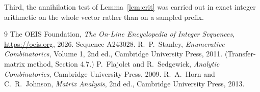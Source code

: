 \documentclass[11pt,a4paper]{article}
\theoremstyle{plain}
\theoremstyle{definition}
\begin{document}
Third, the annihilation test of Lemma~\ref{lem:crit} was carried out in exact integer
arithmetic on the whole vector rather than on a sampled prefix.

\begin{thebibliography}{9}
 The OEIS Foundation, \emph{The On-Line Encyclopedia of Integer
Sequences}, \url{https://oeis.org}, 2026. Sequence A243028.
 R.~P.~Stanley, \emph{Enumerative Combinatorics}, Volume 1, 2nd ed.,
Cambridge University Press, 2011. (Transfer-matrix method, Section 4.7.)
 P.~Flajolet and R.~Sedgewick, \emph{Analytic Combinatorics}, Cambridge
University Press, 2009.
 R.~A.~Horn and C.~R.~Johnson, \emph{Matrix Analysis}, 2nd ed., Cambridge
University Press, 2013.
\end{thebibliography}
\end{document}
